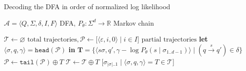 \documentclass{beamer}
\begin{document}
\begin{frame}[fragile]{Decoding the DFA in order of normalized log likelihood}
\vspace{-0.3cm}
\begin{algorithm}[H]
\caption{Steerable DFA walk}
\label{alg:adaptive}
\begin{algorithmic}[1]
\Require $\mathcal{A} = \langle Q, \Sigma, \delta, I, F\rangle$ DFA, $P_\theta: \Sigma^d \rightarrow \mathbb{R}$ Markov chain

\State $\mathcal{T} \gets \varnothing \text{ total trajectories}, \mathcal{P} \gets \big[\langle \varepsilon, i, 0\rangle \mid i \in I\big] \text{ partial trajectories}$
\Repeat
\State \textbf{let }$\langle \sigma, q, \gamma \rangle = \texttt{head}(\mathcal{P})$ \textbf{in}
\State {}$\mathbf{T} = \big\{\langle s\sigma, q', \gamma - \log P_\theta(s \mid \sigma_{1..d-1}) \rangle\mid (q\overset{s}{\rightarrow}q') \in \delta\big\}$
\State $\mathcal{P} \gets \texttt{tail}(\mathcal{P}) \oplus T$ 
\EndIf
{}
\State $\mathcal{T} \gets \mathcal{T} \oplus T$ 
\EndIf
\EndFor
{}
\State \Return $\big[\sigma_{|\sigma|..1} \mid \langle \sigma, q, \gamma \rangle = T \in \mathcal{T}\big]$ 
\end{algorithmic}
\end{algorithm}
\end{frame}
\end{document}
